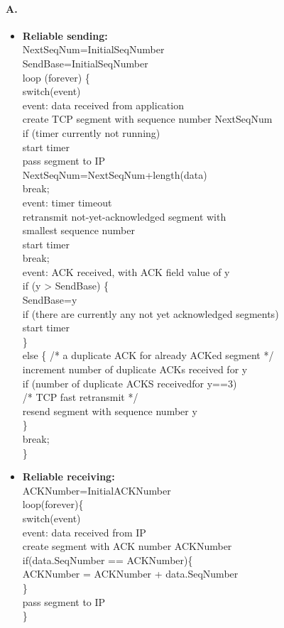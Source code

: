 \paragraph{A.}
\begin{itemize}
	\item 
	\textbf{Reliable sending:}\\
	NextSeqNum=InitialSeqNumber\\
	SendBase=InitialSeqNumber\\
	loop (forever) \{\\
	switch(event)\\
	event: data received from application\\ 
	create TCP segment with sequence number NextSeqNum\\
	if (timer currently not running)\\
	start timer\\
	pass segment to IP\\
	NextSeqNum=NextSeqNum+length(data)\\
	break;\\
	
	event: timer timeout\\
	retransmit not-yet-acknowledged segment with\\
	smallest sequence number\\
	start timer\\
	break;\\
	
	event: ACK received, with ACK field value of y\\
	if (y > SendBase) \{\\
	SendBase=y\\
	if (there are currently any not yet acknowledged segments)\\
	start timer\\
	\}\\
	else \{ /* a duplicate ACK for already ACKed segment */\\
	increment number of duplicate ACKs received for y\\
	if (number of duplicate ACKS receivedfor y==3)\\
	/* TCP fast retransmit */\\
	resend segment with sequence number y\\
	\}\\
	break;\\
	\}\\
	
	\item
	\textbf{Reliable receiving:}\\
	ACKNumber=InitialACKNumber\\
	loop(forever)\{\\
	switch(event)\\
	event: data received from IP\\
	create segment with ACK number ACKNumber\\
	if(data.SeqNumber == ACKNumber)\{\\
	ACKNumber = ACKNumber + data.SeqNumber\\
	\}\\
	pass segment to IP\\
	\}\\
	

\end{itemize}
